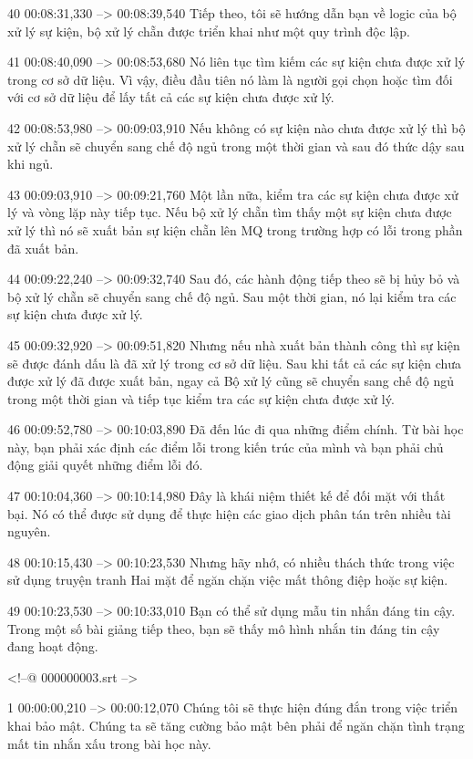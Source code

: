 40
00:08:31,330 --> 00:08:39,540
Tiếp theo, tôi sẽ hướng dẫn bạn về logic của bộ xử lý sự kiện, bộ xử lý chẵn được triển khai như một quy trình độc lập.

41
00:08:40,090 --> 00:08:53,680
Nó liên tục tìm kiếm các sự kiện chưa được xử lý trong cơ sở dữ liệu.  Vì vậy, điều đầu tiên nó làm là người gọi chọn hoặc tìm đối với cơ sở dữ liệu để lấy tất cả các sự kiện chưa được xử lý.

42
00:08:53,980 --> 00:09:03,910
Nếu không có sự kiện nào chưa được xử lý thì bộ xử lý chẵn sẽ chuyển sang chế độ ngủ trong một thời gian và sau đó thức dậy sau khi ngủ.

43
00:09:03,910 --> 00:09:21,760
Một lần nữa, kiểm tra các sự kiện chưa được xử lý và vòng lặp này tiếp tục.  Nếu bộ xử lý chẵn tìm thấy một sự kiện chưa được xử lý thì nó sẽ xuất bản sự kiện chẵn lên MQ trong trường hợp có lỗi trong phần đã xuất bản.

44
00:09:22,240 --> 00:09:32,740
Sau đó, các hành động tiếp theo sẽ bị hủy bỏ và bộ xử lý chẵn sẽ chuyển sang chế độ ngủ.  Sau một thời gian, nó lại kiểm tra các sự kiện chưa được xử lý.

45
00:09:32,920 --> 00:09:51,820
Nhưng nếu nhà xuất bản thành công thì sự kiện sẽ được đánh dấu là đã xử lý trong cơ sở dữ liệu.  Sau khi tất cả các sự kiện chưa được xử lý đã được xuất bản, ngay cả Bộ xử lý cũng sẽ chuyển sang chế độ ngủ trong một thời gian và tiếp tục kiểm tra các sự kiện chưa được xử lý.

46
00:09:52,780 --> 00:10:03,890
Đã đến lúc đi qua những điểm chính.  Từ bài học này, bạn phải xác định các điểm lỗi trong kiến ​​trúc của mình và bạn phải chủ động giải quyết những điểm lỗi đó.

47
00:10:04,360 --> 00:10:14,980
Đây là khái niệm thiết kế để đối mặt với thất bại.  Nó có thể được sử dụng để thực hiện các giao dịch phân tán trên nhiều tài nguyên.

48
00:10:15,430 --> 00:10:23,530
Nhưng hãy nhớ, có nhiều thách thức trong việc sử dụng truyện tranh Hai mặt để ngăn chặn việc mất thông điệp hoặc sự kiện.

49
00:10:23,530 --> 00:10:33,010
Bạn có thể sử dụng mẫu tin nhắn đáng tin cậy.  Trong một số bài giảng tiếp theo, bạn sẽ thấy mô hình nhắn tin đáng tin cậy đang hoạt động.

<!--@ 000000003.srt -->

1
00:00:00,210 --> 00:00:12,070
Chúng tôi sẽ thực hiện đúng đắn trong việc triển khai bảo mật.  Chúng ta sẽ tăng cường bảo mật bên phải để ngăn chặn tình trạng mất tin nhắn xấu trong bài học này.

